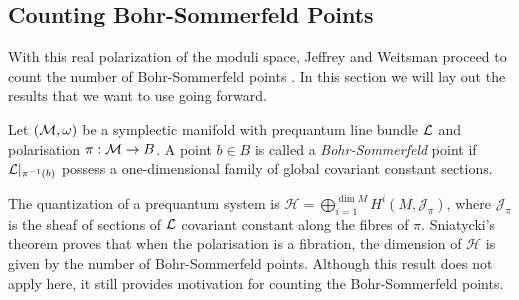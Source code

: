 	\subsection{Counting Bohr-Sommerfeld Points}
	With this real polarization of the moduli space, Jeffrey and Weitsman proceed to count the number of Bohr-Sommerfeld points \cite{jeffrey_bohr-sommerfeld_1992}. In this section we will lay out the results that we want to use going forward.
	
	\begin{definition}
		Let $(\mathcal{M},\omega)$ be a symplectic manifold with prequantum line bundle $\mathcal{L}$ and polarisation $\pi:\mathcal{M}\to B$. A point $b\in B$ is called a \emph{Bohr-Sommerfeld} point if $\mathcal{L}|_{\pi^{-1}(b)}$ possess a one-dimensional family of global covariant constant sections.
	\end{definition}
	The quantization of a prequantum system is $\mathcal{H} = \bigoplus_{i=1}^{\dim M} H^i(M, \mathcal{J}_\pi)$, where $\mathcal{J}_\pi$ is the sheaf of sections of $\mathcal{L}$ covariant constant along the fibres of $\pi$. Sniatycki's theorem \cite{sniatycki_cohomology_1977} proves that when the polarisation is a fibration, the dimension of $\mathcal{H}$ is given by the number of Bohr-Sommerfeld points. Although this result does not apply here, it still provides motivation for counting the Bohr-Sommerfeld points.
	
